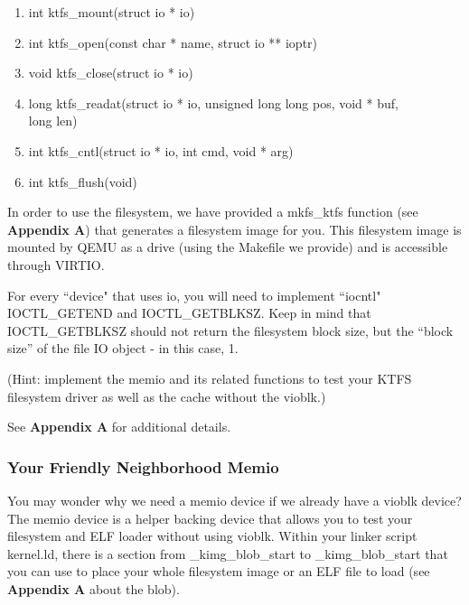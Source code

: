 \documentclass{article}
\begin{document}
	\begin{enumerate}
		\item{\fix int ktfs\_mount(struct io * io)}

		\item{\fix int ktfs\_open(const char * name, struct io ** ioptr)}

		\item{\fix void ktfs\_close(struct io * io)}

		\item{\fix long ktfs\_readat(struct io * io, unsigned long long pos, void * buf, \\
			long len)}

		\item{\fix int ktfs\_cntl(struct io * io, int cmd, void * arg)}

		\item{\fix int ktfs\_flush(void)}
	\end{enumerate}

	In order to use the filesystem, we have provided a {\fix mkfs\_ktfs} function (see \textbf{Appendix A}) that generates a filesystem image for you. This filesystem image
	is mounted by QEMU as a drive (using the {\fix Makefile} we provide) and is accessible through VIRTIO.

	For every ``device" that uses {\fix io}, you will need to implement ``iocntl" {\fix IOCTL\_GETEND} and {\fix IOCTL\_GETBLKSZ}. Keep in mind
	that {\fix IOCTL\_GETBLKSZ} should not return the filesystem block size, but the ``block size'' of the file IO object - in this case, 1.

	(Hint: implement the {\fix memio} and its related functions to test your KTFS filesystem driver as well as the {\fix cache} without the {\fix vioblk}.)

	See \textbf{Appendix A} for additional details.

	\subsubsection{Your Friendly Neighborhood Memio}
	You may wonder why we need a {\fix memio} device if we already have a {\fix vioblk} device?
	The {\fix memio} device is a helper backing device that allows you to test your filesystem and ELF loader without using {\fix vioblk}. 
	Within your linker script {\fix kernel.ld}, there is a section from {\fix \_kimg\_blob\_start} to {\fix \_kimg\_blob\_start} that you can use to place your whole filesystem image or an ELF file to load (see \textbf{Appendix A} about the blob).
\end{document}
